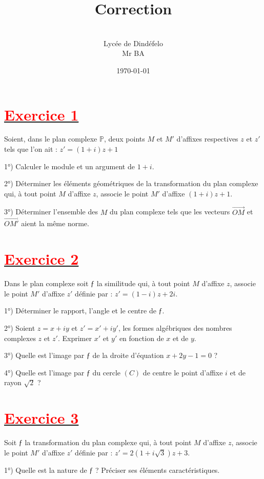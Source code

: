 \documentclass[12pt]{article}
\author{\\Lycée de Dindéfelo\\Mr BA}
\title{\textbf{Correction}}
\date{\today}
\begin{document}
\maketitle
\newpage
\section*{\underline{\textbf{\textcolor{red}{Exercice 1}}}}

Soient, dans le plan complexe $\mathbb{P}$, deux points $M$ et $M'$ d’affixes respectives $z$ et $z'$ tels que l’on ait : $z' = (1 + i) z + 1$

1°) Calculer le module et un argument de $1 + i$.

2°) Déterminer les éléments géométriques de la transformation du plan complexe qui, à tout point $M$ d’affixe $z$, associe le point $M'$ d’affixe $(1 + i) z +1$.

3°) Déterminer l’ensemble des $M$ du plan complexe tels que les vecteurs $\vec{OM}$ et $\vec{OM'}$ aient la même norme.

\section*{\underline{\textbf{\textcolor{red}{Exercice 2}}}}

Dans le plan complexe soit $ƒ$ la similitude qui, à tout point $M$ d’affixe $z$, associe le point $M'$ d’affixe $z'$ définie par : $z' = (1 - i) z + 2i$.

1°) Déterminer le rapport, l’angle et le centre de $ƒ$.

2°) Soient $z = x + iy$ et $z' = x' + iy'$, les formes algébriques des nombres complexes $z$ et $z'$. Exprimer $x'$ et $y'$ en fonction de $x$ et de $y$. 

3°) Quelle est l’image par $ƒ$ de la droite d’équation $x + 2y -1 = 0$ ?

4°) Quelle est l’image par $ƒ$ du cercle $(C)$ de centre le point d’affixe $i$ et de rayon $\sqrt{2}$ ?

\section*{\underline{\textbf{\textcolor{red}{Exercice 3}}}}

Soit $ƒ$ la transformation du plan complexe qui, à tout point $M$ d’affixe $z$, associe le point $M'$ d’affixe $z'$ définie par : $z' = 2(1 + i\sqrt{3})z + 3$.

1°) Quelle est la nature de $ƒ$ ? Préciser ses éléments caractéristiques.
\end{document}

